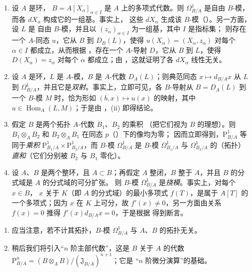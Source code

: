 \begin{examples}[20.4.13]
\label{0.20.4.13-fr}
\begin{enumerate}
  \item[\rm(i)] 设 $A$ 是环，
  $B=A[X_\alpha]_{\alpha\in I}$ 是 $A$ 上的多项式代数。则
  $\Omega^1_{B/A}$ 是自由 $B$-模，而各 $dX_\alpha$ 构成它的一组基。事实上，
  这些 $dX_\alpha$ 生成该 $B$-模（）。另一方面，设 $L$ 是
  自由 $B$-模，并且以 $(z_\alpha)_{\alpha\in I}$ 为一组基，其中 $I$ 是指标集；
  则存在一个 $A$-同态 $u$，它从 $B$ 到 $D_B(L)$，使得
  $u(X_\alpha)=(X_\alpha,z_\alpha)$ 对每个 $\alpha\in I$ 都成立，从而根据
  ，存在一个 $A$-导射 $D$，它从 $B$ 到 $L$，使得
  $D(X_\alpha)=z_\alpha$ 对每个 $\alpha$ 都成立；由
  ，这就证明了各
  $dX_\alpha$ 线性无关。
  \item[\rm(ii)] 设 $A$ 是环，$L$ 是 $A$-模，$B$ 是 $A$-代数
  $D_A(L)$；则典范同态 $x\mapsto d_{B/A}x$ 从 $L$ 到
  $\Omega^1_{B/A}$，并且它是\emph{双射}。事实上，立即可见，各 $B$-导射从
  $B=D_A(L)$ 到一个 $B$-模 $M$ 时，恰为形如
  $(b,x)\mapsto u(x)$ 的映射，其中 $u\in\operatorname{Hom}_A(L,M)$；于是由
  ，(ii) 即得结论。
  \item[\rm(iii)] 假定 $B$ 是两个拓扑 $A$-代数 $B_1$、$B_2$ 的乘积
  （把它们视为 $B$ 的理想）。则 $B_1\otimes_A B_2$ 和
  $B_2\otimes_A B_1$ 在同态 $p$（）下的像均为零；
  因而立即得到，$\mathrm{P}^1_{B/A}$ 等同于\emph{乘积}
  $\mathrm{P}^1_{B_1/A}\times\mathrm{P}^1_{B_2/A}$，而 $B$-模
  $\Omega^1_{B/A}$ 是 $B$-模 $\Omega^1_{B_1/A}$ 与
  $\Omega^1_{B_2/A}$ 的（拓扑）\emph{直和}（它们分别被 $B_2$ 与 $B_1$
  零化）。
  \item[\rm(iv)] 设 $A$、$B$ 是两个整环，且 $A\subset B$；再假定
  $A$ 整闭，$B$ 整于 $A$，并且 $B$ 的分式域是 $A$ 的分式域的可分扩张。
  则 $B$-模 $\Omega^1_{B/A}$ 是\emph{挠模}。事实上，对每个 $x\in B$，
  $x$ 关于 $K$（即 $A$ 的分式域）的最小多项式 $f(T)$，是属于 $A[T]$ 的
  一个多项式；因为 $x$ 在 $K$ 上可分，故 $f'(x)\neq0$，另一方面由关系
  $f(x)=0$ 推得 $f'(x)d_{B/A}x=0$，于是根据  得到断言。
\end{enumerate}
\end{examples}

\begin{remarks}[20.4.14]
\label{0.20.4.14-fr}
\begin{enumerate}
  \item[\rm(i)] 应当注意，若不计其拓扑，$B$-模 $\Omega^1_{B/A}$ 与
  $A$、$B$ 的拓扑无关。
  \item[\rm(ii)] 稍后我们将引入“$n$ 阶主部代数”，这是 $B$ 关于 $A$ 的代数
  $\mathrm{P}^n_{B/A}=(B\otimes_A B)/(\mathfrak{J}_{B/A})^{n+1}$；它是
  “$n$ 阶微分演算”的基础。
\end{enumerate}
\end{remarks}

